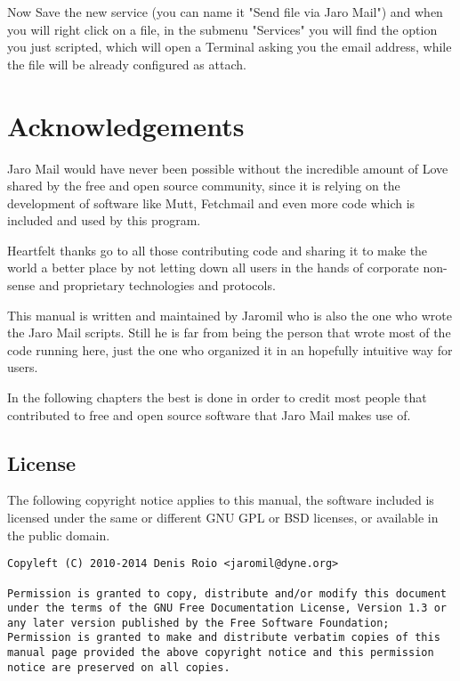 \documentclass[a4,onecolumn,portrait]{article}
\begin{document}
Now Save the new service (you can name it "Send file via Jaro
Mail") and when you will right click on a file, in the submenu
"Services" you will find the option you just scripted, which will
open a Terminal asking you the email address, while the file will
be already configured as attach.



\section{Acknowledgements}
\label{sec-13}

Jaro Mail would have never been possible without the incredible amount
of Love shared by the free and open source community, since it is
relying on the development of software like Mutt, Fetchmail and even
more code which is included and used by this program.

Heartfelt thanks go to all those contributing code and sharing it to
make the world a better place by not letting down all users in the
hands of corporate non-sense and proprietary technologies and
protocols.

This manual is written and maintained by Jaromil who is also the one
who wrote the Jaro Mail scripts. Still he is far from being the person
that wrote most of the code running here, just the one who organized
it in an hopefully intuitive way for users.

In the following chapters the best is done in order to credit most
people that contributed to free and open source software that Jaro
Mail makes use of.

\subsection{License}
\label{sec-13-1}

The following copyright notice applies to this manual, the software
included is licensed under the same or different GNU GPL or BSD
licenses, or available in the public domain.

\begin{verbatim}
Copyleft (C) 2010-2014 Denis Roio <jaromil@dyne.org>

Permission is granted to copy, distribute and/or modify this document
under the terms of the GNU Free Documentation License, Version 1.3 or
any later version published by the Free Software Foundation;
Permission is granted to make and distribute verbatim copies of this
manual page provided the above copyright notice and this permission
notice are preserved on all copies.
\end{verbatim}
\end{document}
